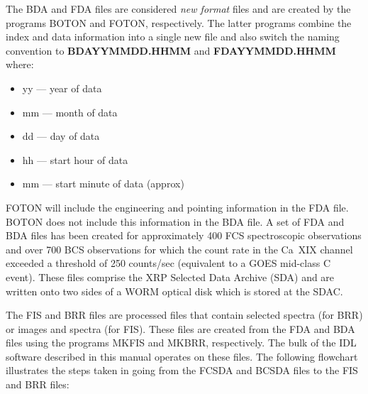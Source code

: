 The BDA and FDA files are considered {\it new format} files and are created  by
the programs BOTON and FOTON, respectively. The latter programs  combine the 
index and data information into a single new file and also switch  the naming
convention to {\bf BDAYYMMDD.HHMM} and {\bf FDAYYMMDD.HHMM} where:

\begin{itemize} 
\item     yy  --- year of data
\item     mm  --- month of data
\item     dd  --- day of data 
\item     hh  --- start hour of data 
\item     mm  --- start minute of data (approx)
\end{itemize}  

FOTON will include the engineering and pointing information in the FDA file. 
BOTON does not include this information in the BDA file. A set of FDA and BDA
files has been created  for approximately 400 FCS spectroscopic observations
and over 700 BCS observations for which the count rate in the Ca~XIX channel
exceeded  a threshold of 250 counts/sec (equivalent to a GOES mid-class C
event). These files comprise the XRP Selected Data Archive (SDA) and are
written onto two sides of a WORM optical disk which is stored at the SDAC.

The FIS and BRR files  are processed files that contain selected spectra (for
BRR) or images and spectra (for FIS). These files are created from the FDA and
BDA files using the programs MKFIS and MKBRR, respectively. The bulk of the IDL
software described in this manual operates on these files. The following
flowchart illustrates the steps taken in going from the FCSDA and BCSDA files
to the FIS and BRR files:

